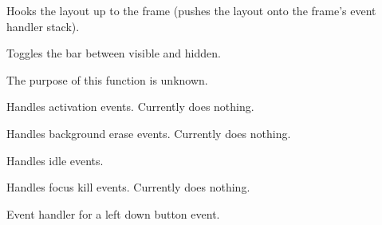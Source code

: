 \label{wxframelayouthookuptoframe}


Hooks the layout up to the frame (pushes the layout onto the
frame's event handler stack).


\label{wxframelayoutinversevisibility}


Toggles the bar between visible and hidden.


\label{wxframelayoutlocatebar}


The purpose of this function is unknown.


\label{wxframelayoutonactivate}


Handles activation events. Currently does nothing.


\label{wxframelayoutonerasebackground}


Handles background erase events. Currently does nothing.


\label{wxframelayoutonidle}


Handles idle events.


\label{wxframelayoutonkillfocus}


Handles focus kill events. Currently does nothing.


\label{wxframelayoutonlbuttondown}


Event handler for a left down button event.


\label{wxframelayoutonlbuttonup}

